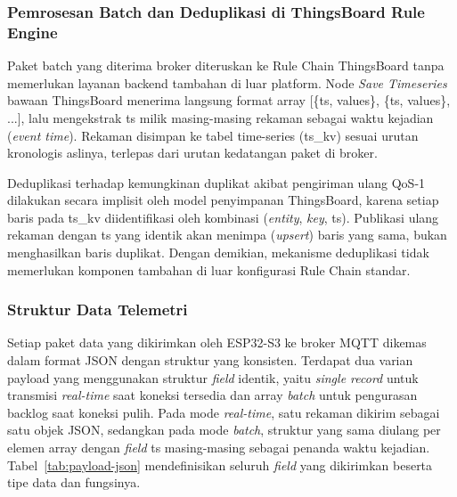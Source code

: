 \subsubsection{Pemrosesan Batch dan Deduplikasi di ThingsBoard Rule Engine}

Paket batch yang diterima broker diteruskan ke Rule Chain ThingsBoard tanpa memerlukan
layanan backend tambahan di luar platform. Node \textit{Save Timeseries} bawaan
ThingsBoard menerima langsung format array [\{ts, values\}, \{ts, values\}, ...],
lalu mengekstrak ts milik masing-masing rekaman sebagai waktu kejadian (\textit{event time}).
Rekaman disimpan ke tabel time-series (ts\_kv) sesuai urutan kronologis aslinya, terlepas
dari urutan kedatangan paket di broker.

Deduplikasi terhadap kemungkinan duplikat akibat pengiriman ulang QoS-1 dilakukan secara
implisit oleh model penyimpanan ThingsBoard, karena setiap baris pada ts\_kv
diidentifikasi oleh kombinasi (\textit{entity}, \textit{key}, ts). Publikasi
ulang rekaman dengan ts yang identik akan menimpa (\textit{upsert}) baris yang sama, bukan
menghasilkan baris duplikat. Dengan demikian, mekanisme deduplikasi tidak memerlukan
komponen tambahan di luar konfigurasi Rule Chain standar.

\subsubsection{Struktur Data Telemetri}
\label{subsubsec:payload-json}

Setiap paket data yang dikirimkan oleh ESP32-S3 ke broker MQTT
dikemas dalam format JSON dengan struktur yang konsisten.
Terdapat dua varian payload yang menggunakan struktur \textit{field}
identik, yaitu \textit{single record} untuk transmisi \textit{real-time}
saat koneksi tersedia dan array \textit{batch} untuk pengurasan backlog
saat koneksi pulih. Pada
mode \textit{real-time}, satu rekaman dikirim sebagai satu objek JSON,
sedangkan pada mode \textit{batch}, struktur yang sama diulang per elemen
array dengan \textit{field} ts masing-masing sebagai penanda waktu
kejadian. Tabel~\ref{tab:payload-json} mendefinisikan seluruh \textit{field}
yang dikirimkan beserta tipe data dan fungsinya.

